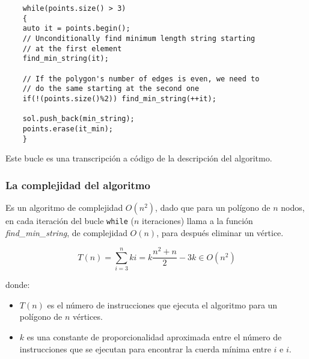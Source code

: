 \documentclass[a4paper, 11pt]{article}
\begin{document}
	\begin{lstlisting}
	while(points.size() > 3)
	{
	auto it = points.begin();
	// Unconditionally find minimum length string starting
	// at the first element
	find_min_string(it);
	
	// If the polygon's number of edges is even, we need to
	// do the same starting at the second one
	if(!(points.size()%2)) find_min_string(++it);
	
	sol.push_back(min_string);
	points.erase(it_min);
	}
	\end{lstlisting}
	
Este bucle es una transcripción a código de la descripción del algoritmo.

\subsubsection{La complejidad del algoritmo}
Es un algoritmo de complejidad $O(n^2)$, dado que para un polígono de $n$ nodos, en cada iteración del bucle \texttt{while} ($n$ iteraciones) llama a la función \textit{find\_min\_string}, de complejidad $O(n)$, para después eliminar un vértice.

\[
T(n) = \sum_{i=3}^n ki = k\frac{n^2+n}{2}-3k \in O(n^2)
\]

donde:
\begin{itemize}
\item $T(n)$ es el número de instrucciones que ejecuta el algoritmo para un polígono de $n$ vértices.
\item $k$ es una constante de proporcionalidad aproximada entre el número de instrucciones que se ejecutan para encontrar la cuerda mínima entre $i$ e $i$. 
	
\end{itemize}
\end{document}
